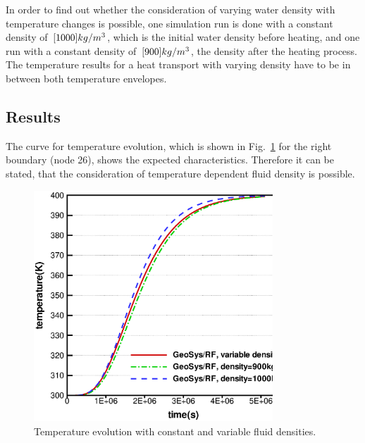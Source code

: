 In order to find out whether the consideration of varying water density with temperature changes is possible, one simulation run is done with a constant density of $\, \mathrm{[}1000]{kg/m^{3}}$, which is the initial water density before heating, and one run with a constant density of $\, \mathrm{[}900]{kg/m^{3}}$, the density after the heating process. The temperature results for a heat transport with varying density have to be in between both temperature envelopes.

\subsection{Results}

The curve for temperature evolution, which is shown in Fig.~\ref{figHT1} for the right boundary (node 26), shows the expected characteristics. Therefore it can be stated, that the consideration of temperature dependent fluid density is possible.

\begin{figure}[htbp]
\centering
\includegraphics[width=0.8\textwidth]{PART_II/T/figHT1.eps}
\caption{\label{figHT1}Temperature evolution with constant and variable fluid densities.}
\end{figure}
